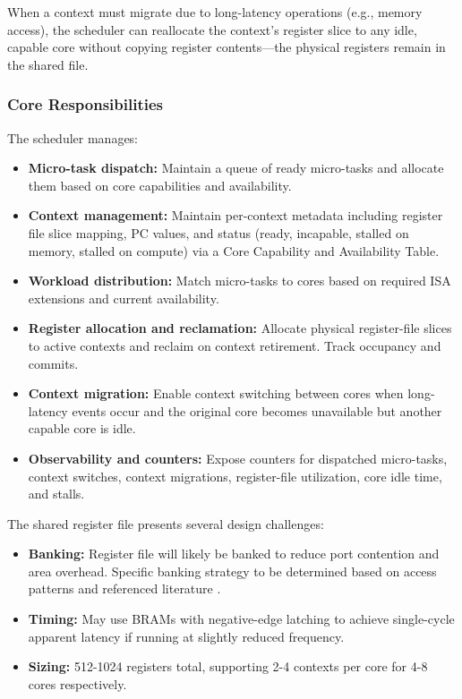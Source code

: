 \documentclass[12pt,letterpaper]{report}
\theoremstyle{definition}
\theoremstyle{plain}
\begin{document}
When a context must migrate due to long-latency operations (e.g., memory access), 
the scheduler can reallocate the context's register slice to any idle, capable core 
without copying register contents—the physical registers remain in the shared file.

\subsubsection{Core Responsibilities}
The scheduler manages:
\begin{itemize}
    \item \textbf{Micro-task dispatch:} Maintain a queue of ready micro-tasks 
          and allocate them based on core capabilities and availability.
    \item \textbf{Context management:} Maintain per-context metadata including 
          register file slice mapping, PC values, and status (ready, incapable, 
          stalled on memory, stalled on compute) via a Core Capability and 
          Availability Table.
    \item \textbf{Workload distribution:} Match micro-tasks to cores based on 
          required ISA extensions and current availability.
    \item \textbf{Register allocation and reclamation:} Allocate physical register-file 
          slices to active contexts and reclaim on context retirement. Track 
          occupancy and commits.
    \item \textbf{Context migration:} Enable context switching between cores when 
          long-latency events occur and the original core becomes unavailable but 
          another capable core is idle.
    \item \textbf{Observability and counters:} Expose counters for dispatched micro-tasks, 
          context switches, context migrations, register-file utilization, core idle 
          time, and stalls.
\end{itemize}

\begin{designbox}[title=Register File Design Considerations]
The shared register file presents several design challenges:
\begin{itemize}
    \item \textbf{Banking:} Register file will likely be banked to reduce port 
          contention and area overhead. Specific banking strategy to be determined 
          based on access patterns and referenced literature \cite{registerbank1, registerbank2}.
    \item \textbf{Timing:} May use BRAMs with negative-edge latching to achieve 
          single-cycle apparent latency if running at slightly reduced frequency.
    \item \textbf{Sizing:} 512-1024 registers total, supporting 2-4 contexts per core 
          for 4-8 cores respectively.
\end{itemize}
\end{designbox}
\end{document}
